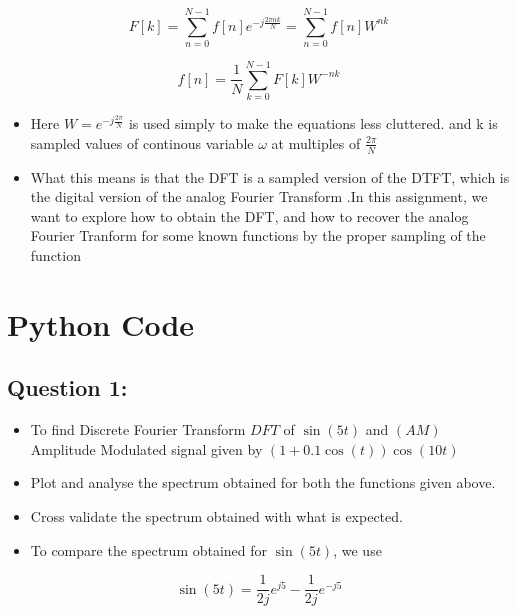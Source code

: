 \documentclass[11pt, a4paper]{article}
\begin{document}
\begin{equation}
F[k] = \sum_{n = 0}^{N-1} f[n]e^{-j\frac {2\pi nk}{N}} = \sum_{n = 0}^{N-1} f[n]W^{nk}
\end{equation}

\begin{equation}
f[n] = \frac{1}{N} \sum_{k = 0}^{N-1} F[k]W^{-nk}
\end{equation}

\begin{itemize}
\item
  Here $W = e^{-j\frac{2\pi}{N}}$ is used simply to make the
  equations less cluttered. and k is sampled values of continous
  variable \(\omega\) at multiples of \(\frac{2\pi}{N}\)
\item
  What this means is that the DFT is a sampled version of the DTFT,
  which is the digital version of the analog Fourier Transform .In this
  assignment, we want to explore how to obtain the DFT, and how to
  recover the analog Fourier Tranform for some known functions by the
  proper sampling of the function
\end{itemize}

\newpage
\section{Python Code}\label{code}

\subsection{Question 1:}\label{question-1}

\begin{itemize}

\item
  To find Discrete Fourier Transform \(DFT\) of \(\sin\left(5t\right)\)
  and \((AM)\) Amplitude Modulated signal given by
  \(\left(1+0.1\cos\left(t\right)\right)\cos\left(10t\right)\)
\item
  Plot and analyse the spectrum obtained for both the functions given
  above.
\item
  Cross validate the spectrum obtained with what is expected.
\item
  To compare the spectrum obtained for \(\sin(5t)\), we use
\end{itemize}

\begin{equation}
\sin(5t) = \frac{1}{2j}e^{j5} - \frac{1}{2j}e^{-j5}
\end{equation}
\end{document}
